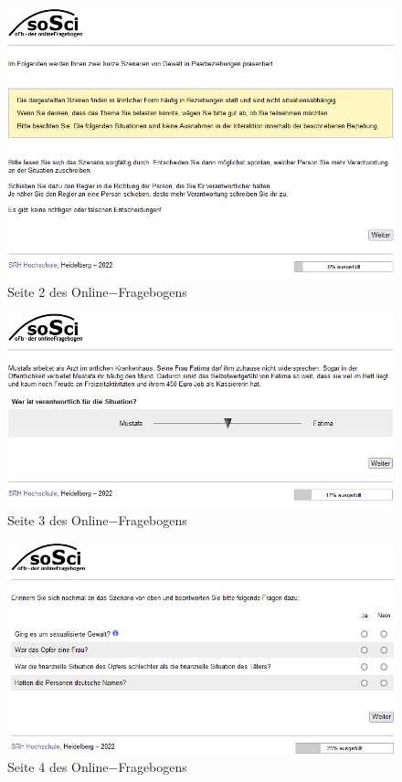 \begin{appendices}
    \newpage
    \begin{figure}[htb!]
        \centering
            \includegraphics[width=\textwidth]{Seite 2.png}
            \caption[]{Seite 2 des Online$-$Fragebogens}
    \end{figure}

    \begin{figure}[htb!]
        \centering
            \includegraphics[width=\textwidth]{Seite 3.png}
            \caption[]{Seite 3 des Online$-$Fragebogens}
    \end{figure}
    
    \newpage
    \begin{figure}[htb!]
        \centering
            \includegraphics[width=\textwidth]{Seite 4.png}
            \caption[]{Seite 4 des Online$-$Fragebogens}
    \end{figure}
    

\end{appendices}
